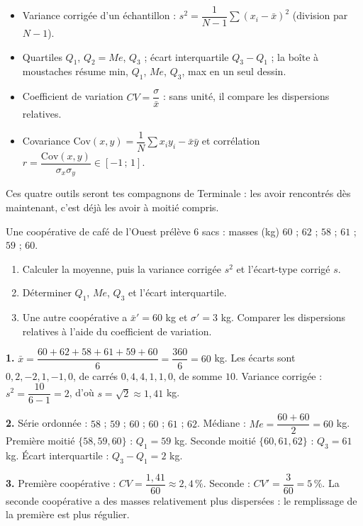 \documentclass[11pt]{article}
\begin{document}
\begin{aretenir}
\begin{itemize}
\item Variance corrigée d'un échantillon : $s^2 = \dfrac{1}{N-1}\sum (x_i - \bar{x})^2$ (division par $N-1$).
\item Quartiles $Q_1$, $Q_2 = Me$, $Q_3$ ; écart interquartile $Q_3 - Q_1$ ; la boîte à moustaches résume min, $Q_1$, $Me$, $Q_3$, max en un seul dessin.
\item Coefficient de variation $CV = \dfrac{\sigma}{\bar{x}}$ : sans unité, il compare les dispersions relatives.
\item Covariance $\mathrm{Cov}(x,y) = \dfrac{1}{N}\sum x_i y_i - \bar{x}\bar{y}$ et corrélation $r = \dfrac{\mathrm{Cov}(x,y)}{\sigma_x \sigma_y} \in [-1\,;\,1]$.
\end{itemize}
Ces quatre outils seront tes compagnons de Terminale : les avoir rencontrés dès maintenant, c'est déjà les avoir à moitié compris.
\end{aretenir}

\begin{exercice}
Une coopérative de café de l'Ouest prélève 6 sacs : masses (kg) $60$ ; $62$ ; $58$ ; $61$ ; $59$ ; $60$.
\begin{enumerate}
\item Calculer la moyenne, puis la variance corrigée $s^2$ et l'écart-type corrigé $s$.
\item Déterminer $Q_1$, $Me$, $Q_3$ et l'écart interquartile.
\item Une autre coopérative a $\bar{x}' = 60$ kg et $\sigma' = 3$ kg. Comparer les dispersions relatives à l'aide du coefficient de variation.
\end{enumerate}
\end{exercice}

\begin{corrige}
\textbf{1.} $\bar{x} = \dfrac{60+62+58+61+59+60}{6} = \dfrac{360}{6} = 60$ kg. Les écarts sont $0, 2, -2, 1, -1, 0$, de carrés $0, 4, 4, 1, 1, 0$, de somme $10$. Variance corrigée : $s^2 = \dfrac{10}{6-1} = 2$, d'où $s = \sqrt{2} \approx 1,41$ kg.

\textbf{2.} Série ordonnée : $58$ ; $59$ ; $60$ ; $60$ ; $61$ ; $62$. Médiane : $Me = \dfrac{60+60}{2} = 60$ kg. Première moitié $\{58, 59, 60\}$ : $Q_1 = 59$ kg. Seconde moitié $\{60, 61, 62\}$ : $Q_3 = 61$ kg. Écart interquartile : $Q_3 - Q_1 = 2$ kg.

\textbf{3.} Première coopérative : $CV = \dfrac{1,41}{60} \approx 2,4\,\%$. Seconde : $CV' = \dfrac{3}{60} = 5\,\%$. La seconde coopérative a des masses relativement plus dispersées : le remplissage de la première est plus régulier.
\end{corrige}
\end{document}
